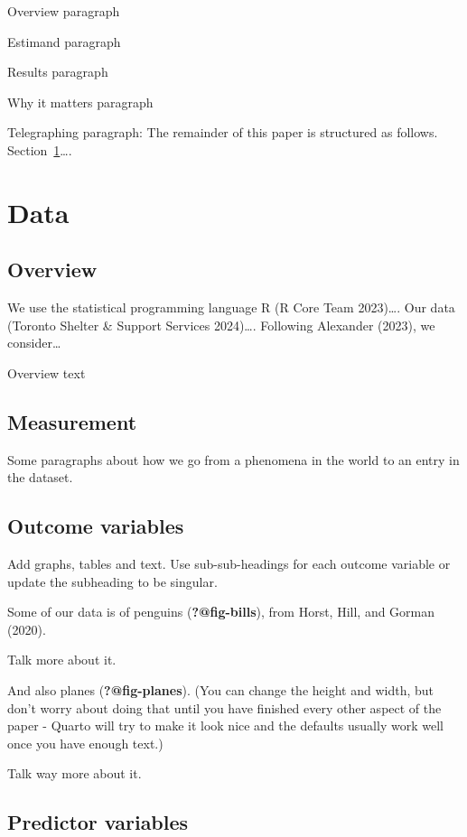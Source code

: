 \documentclass[
  letterpaper,
  DIV=11,
  numbers=noendperiod]{scrartcl}
\begin{document}
Overview paragraph

Estimand paragraph

Results paragraph

Why it matters paragraph

Telegraphing paragraph: The remainder of this paper is structured as
follows. Section~\ref{sec-data}\ldots.

\section{Data}\label{sec-data}

\subsection{Overview}\label{overview}

We use the statistical programming language R (R Core Team 2023)\ldots.
Our data (Toronto Shelter \& Support Services 2024)\ldots. Following
Alexander (2023), we consider\ldots{}

Overview text

\subsection{Measurement}\label{measurement}

Some paragraphs about how we go from a phenomena in the world to an
entry in the dataset.

\subsection{Outcome variables}\label{outcome-variables}

Add graphs, tables and text. Use sub-sub-headings for each outcome
variable or update the subheading to be singular.

Some of our data is of penguins (\textbf{?@fig-bills}), from Horst,
Hill, and Gorman (2020).

Talk more about it.

And also planes (\textbf{?@fig-planes}). (You can change the height and
width, but don't worry about doing that until you have finished every
other aspect of the paper - Quarto will try to make it look nice and the
defaults usually work well once you have enough text.)

Talk way more about it.

\subsection{Predictor variables}\label{predictor-variables}
\end{document}
